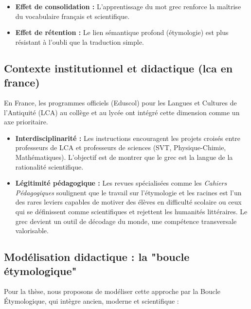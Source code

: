 \begin{itemize}\item \textbf{Effet de consolidation :} L'apprentissage du mot grec renforce la maîtrise du vocabulaire français et scientifique.\item \textbf{Effet de rétention :} Le lien sémantique profond (étymologie) est plus résistant à l'oubli que la traduction simple.\end{itemize}

\subsection{Contexte institutionnel et didactique (lca en france)}

En France, les programmes officiels (Eduscol) pour les Langues et Cultures de l'Antiquité (LCA) au
collège et au lycée ont intégré cette dimension comme un axe prioritaire.\cite{ref50}

\begin{itemize}\item \textbf{Interdisciplinarité :} Les instructions encouragent les projets croisés entre professeurs de LCA et professeurs de sciences (SVT, Physique-Chimie, Mathématiques). L'objectif est de montrer que le grec est la langue de la rationalité scientifique.\cite{ref50}\item \textbf{Légitimité pédagogique :} Les revues spécialisées comme les \textit{Cahiers Pédagogiques} soulignent que le travail sur l'étymologie et les racines est l'un des rares leviers capables de motiver des élèves en difficulté scolaire ou ceux qui se définissent comme \og scientifiques\fg{} et rejettent les humanités littéraires.\cite{ref54} Le grec devient un outil de décodage du monde, une compétence transversale valorisable.\end{itemize}

\subsection{Modélisation didactique : la "boucle étymologique"}

Pour la thèse, nous proposons de modéliser cette approche par la \og Boucle Étymologique\fg{}, qui
intègre ancien, moderne et scientifique :

